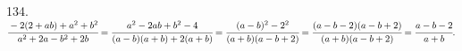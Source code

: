 134. $\cfrac{-2(2+ab)+a^2+b^2}{a^2+2a-b^2+2b}=\cfrac{a^2-2ab+b^2-4}{(a-b)(a+b)+2(a+b)}=\cfrac{(a-b)^2-2^2}{(a+b)(a-b+2)}=
\cfrac{(a-b-2)(a-b+2)}{(a+b)(a-b+2)}=\cfrac{a-b-2}{a+b}.$\\
